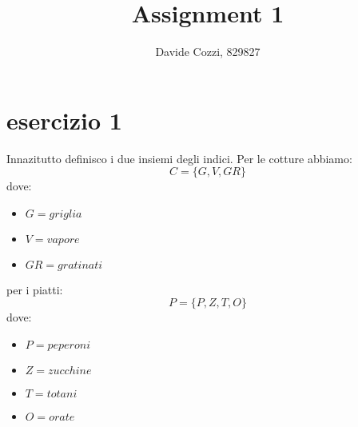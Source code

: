 \documentclass[a4paper,12pt, oneside]{book}
\title{Assignment 1}
\author{Davide Cozzi, 829827}
\date{}
\begin{document}
\maketitle

\newtheorem{teorema}{Teorema}
\newtheorem{definizione}{Definizione}
\newtheorem{esempio}{Esempio}
\newtheorem{corollario}{Corollario}
\newtheorem{lemma}{Lemma}
\newtheorem{osservazione}{Osservazione}
\newtheorem{nota}{Nota}
\newtheorem{esercizio}{Esercizio}

\renewcommand{\chaptermark}[1]{%
  \markboth{\chaptername
    \ \thechapter.\ #1}{}}
\renewcommand{\sectionmark}[1]{\markright{\thesection.\ #1}}
\chapter{esercizio 1}
Innazitutto definisco i due insiemi degli indici. Per le cotture abbiamo:
\[C=\{G,V,GR\}\]
dove:
\begin{itemize}
  \item $G=griglia$
  \item $V=vapore$
  \item $GR=gratinati$
\end{itemize}
per i piatti:
\[P=\{P,Z,T,O\}\]
dove:
\begin{itemize}
  \item $P=peperoni$
  \item $Z=zucchine$
  \item $T=totani$
  \item $O=orate$
\end{itemize}
\end{document}
